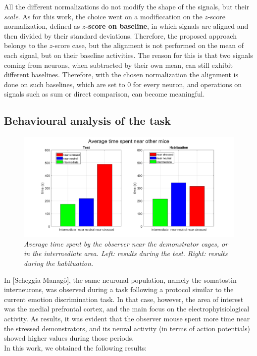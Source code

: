\documentclass[12pt, a4paper]{article}
\begin{document}
All the different normalizations do not modify the shape of the signals, but their \textit{scale}. As for this work, the choice went on a modificcation on the $z$-score normalization, defined as \textbf{$z$-score on baseline}, in which signals are aligned and then divided by their standard deviations. Therefore, the proposed approach belongs to the $z$-score case, but the alignment is not performed on the mean of each signal, but on their baseline activities. The reason for this is that two signals coming from neurons, when subtracted by their own mean, can still exhibit different baselines. Therefore, with the chosen normalization the alignment is done on such baselines, which are set to $0$ for every neuron, and operations on signals such as sum or direct comparison, can become meaningful.



\subsection{Behavioural analysis of the task}


\begin{figure}[H]
	
	\centering
	
	\hspace*{-1 cm}
	\includegraphics[scale=.37]{times.png} 
	\caption{\textit{Average time spent by the observer near the demonstrator cages, or in the intermediate area. Left: results during the test. Right: results during the habituation. }} \label{times}
	
\end{figure}

In [Scheggia-Managò], the same neuronal population, namely the somatostin interneurons, was observed during a task following a protocol similar to the current emotion discrimination task. In that case, however, the area of interest was the medial prefrontal cortex, and the main focus on the electrophyisiological activity. As results, it was evident that the observer mouse spent more time near the stressed demonstrators, and its neural activity (in terms of action potentials) showed higher values during those periods.\\
In this work, we obtained the following results:
\end{document}
